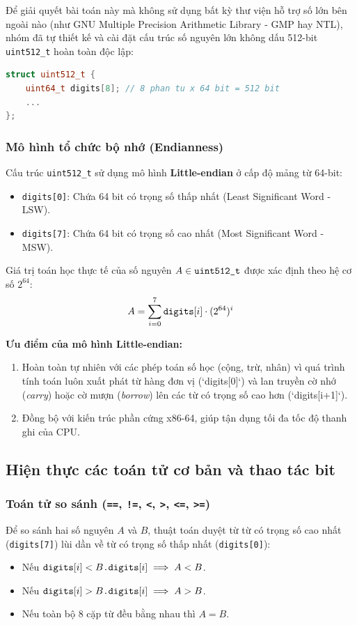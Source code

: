 \documentclass[12pt,a4paper]{article}
\theoremstyle{plain}
\begin{document}
Để giải quyết bài toán này mà không sử dụng bất kỳ thư viện hỗ trợ số lớn bên ngoài nào (như GNU Multiple Precision Arithmetic Library - GMP hay NTL), nhóm đã tự thiết kế và cài đặt cấu trúc số nguyên lớn không dấu 512-bit \texttt{uint512\_t} hoàn toàn độc lập:

\begin{lstlisting}[language=C++]
struct uint512_t {
    uint64_t digits[8]; // 8 phan tu x 64 bit = 512 bit
    ...
};
\end{lstlisting}

\subsubsection{Mô hình tổ chức bộ nhớ (Endianness)}
Cấu trúc \texttt{uint512\_t} sử dụng mô hình \textbf{Little-endian} ở cấp độ mảng từ 64-bit:
\begin{itemize}
    \item \texttt{digits[0]}: Chứa 64 bit có trọng số thấp nhất (Least Significant Word - LSW).
    \item \texttt{digits[7]}: Chứa 64 bit có trọng số cao nhất (Most Significant Word - MSW).
\end{itemize}
Giá trị toán học thực tế của số nguyên $A \in \text{\texttt{uint512\_t}}$ được xác định theo hệ cơ số $2^{64}$:
\begin{equation}
A = \sum_{i=0}^{7} \text{\texttt{digits}}[i] \cdot (2^{64})^i
\end{equation}

\textbf{Ưu điểm của mô hình Little-endian:}
\begin{enumerate}
    \item Hoàn toàn tự nhiên với các phép toán số học (cộng, trừ, nhân) vì quá trình tính toán luôn xuất phát từ hàng đơn vị (`digits[0]`) và lan truyền cờ nhớ (\textit{carry}) hoặc cờ mượn (\textit{borrow}) lên các từ có trọng số cao hơn (`digits[i+1]`).
    \item Đồng bộ với kiến trúc phần cứng x86-64, giúp tận dụng tối đa tốc độ thanh ghi của CPU.
\end{enumerate}

\subsection{Hiện thực các toán tử cơ bản và thao tác bit}

\subsubsection{Toán tử so sánh (\texttt{==}, \texttt{!=}, \texttt{<}, \texttt{>}, \texttt{<=}, \texttt{>=})}
Để so sánh hai số nguyên $A$ và $B$, thuật toán duyệt từ từ có trọng số cao nhất (\texttt{digits[7]}) lùi dần về từ có trọng số thấp nhất (\texttt{digits[0]}):
\begin{itemize}
    \item Nếu $\text{\texttt{digits}}[i] < B\text{\texttt{.digits}}[i] \implies A < B$.
    \item Nếu $\text{\texttt{digits}}[i] > B\text{\texttt{.digits}}[i] \implies A > B$.
    \item Nếu toàn bộ 8 cặp từ đều bằng nhau thì $A = B$.
\end{itemize}
\end{document}
